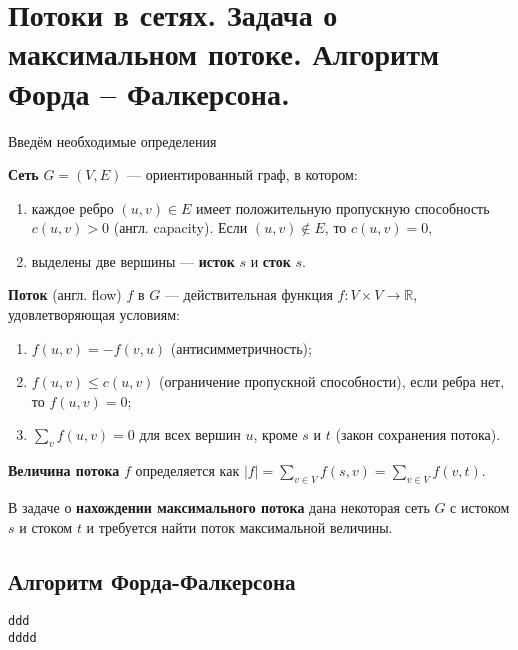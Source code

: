\section{Потоки в сетях. Задача о максимальном потоке. Алгоритм Форда – Фалкерсона.}
Введём необходимые определения

\textbf{Сеть} $G = (V, E)$  --- ориентированный граф, в котором:
\begin{enumerate}
	\item каждое ребро $(u,v) \in E$
	имеет положительную пропускную способность $c(u, v) > 0$ (англ. capacity). Если $(u, v) \notin E$, то $c(u, v) = 0$,
	\item выделены две вершины --- \textbf{исток} $s$ и \textbf{сток} $s$.
\end{enumerate}

\textbf{Поток} (англ. flow) $f$ в $G$ --- действительная функция $f: V \times V \to \mathbb{R}$, удовлетворяющая условиям:

\begin{enumerate}
	\item $f(u, v) = -f(v, u)$ (антисимметричность);
	\item $f(u, v) \le c(u, v)$ (ограничение пропускной способности), если ребра нет, то $f(u, v) = 0$;
	\item $\sum_v f(u, v) = 0$ для всех вершин $u$, кроме $s$ и $t$ (закон сохранения потока).
\end{enumerate}

\noindent \textbf{Величина потока} $f$ определяется как $\displaystyle |f| = \sum_{v \in V} f(s, v) = \sum_{v \in V} f(v,t)$.

В задаче о \textbf{нахождении максимального потока} дана некоторая сеть $G$ с истоком $s$ и стоком $t$ и требуется найти поток максимальной величины.

 
\subsection*{Алгоритм Форда-Фалкерсона}

\begin{verbatim}
ddd
dddd
\end{verbatim}




